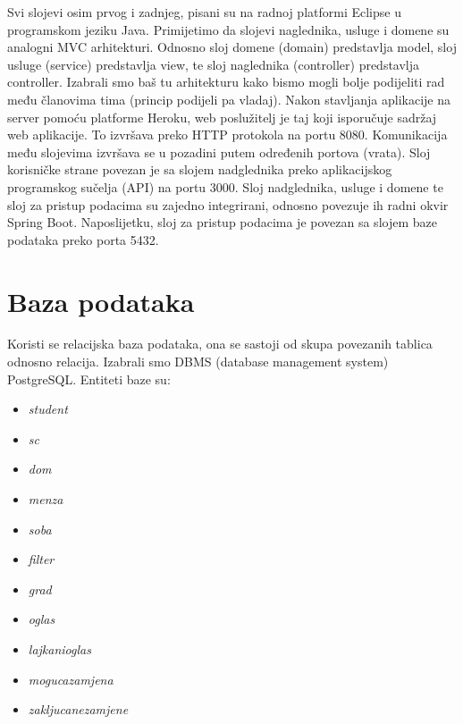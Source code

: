 		
		Svi slojevi osim prvog i zadnjeg, pisani su na radnoj platformi Eclipse u programskom jeziku Java.
		\newline
		\hspace* {8mm} Primijetimo da slojevi naglednika, usluge i domene su analogni MVC arhitekturi. Odnosno sloj domene (domain) predstavlja model, sloj usluge (service) predstavlja view, te sloj naglednika (controller) predstavlja controller.
		\newline
		\hspace* {8mm} Izabrali smo baš tu arhitekturu kako bismo mogli bolje podijeliti rad među članovima tima (princip podijeli pa vladaj).
		\newline
		\hspace* {8mm} Nakon stavljanja aplikacije na server pomoću platforme Heroku, web poslužitelj je taj koji isporučuje sadržaj web aplikacije. To izvršava preko HTTP protokola na portu 8080.
		\newline
		\hspace* {8mm} Komunikacija među slojevima izvršava se u pozadini putem određenih portova (vrata). Sloj korisničke strane povezan je sa slojem nadglednika preko aplikacijskog programskog sučelja (API) na portu 3000. Sloj nadglednika, usluge i domene te sloj za pristup podacima su zajedno integrirani, odnosno povezuje ih radni okvir Spring Boot. Naposlijetku, sloj za pristup podacima je povezan sa slojem baze podataka preko porta 5432.
		
		
		

				
		\section{Baza podataka}
			
			
		\hspace{10mm} Koristi se relacijska baza podataka, ona se sastoji od skupa povezanih tablica odnosno relacija. Izabrali smo DBMS (database management system) PostgreSQL.
		\newline
		Entiteti baze su:
		\begin{itemize}
		\item \textit{student}
		\item \textit{sc}
		\item \textit{dom}
		\item \textit{menza}
		\item \textit{soba}
		\item \textit{filter}
		\item \textit{grad}
		\item \textit{oglas}
		\item \textit{lajkani\textunderscore oglas}
		\item \textit{moguca\textunderscore zamjena}
		\item \textit{zakljucane\textunderscore zamjene}
		\end{itemize}
		
